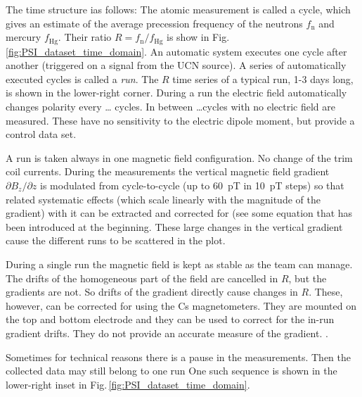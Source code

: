 The time structure ias follows: The atomic measurement is called a cycle, which gives an estimate of the average precession frequency of the neutrons $f_\mathrm{n}$ and mercury $f_\mathrm{Hg}$. Their ratio $R = f_\mathrm{n} / f_\mathrm{Hg}$ is show in Fig.\,\ref{fig:PSI_dataset_time_domain}. An automatic system executes one cycle after another (triggered on a signal from the UCN source). A series of automatically executed cycles is called a \emph{run}. The $R$ time series of a typical run, 1-3 days long, is shown in the lower-right corner. During a run the electric field automatically changes polarity every \ldots {} cycles. In between \ldots cycles with no electric field are measured. These have no sensitivity to the electric dipole moment, but provide a control data set.

A run is taken always in one magnetic field configuration. No change of the trim coil currents. During the measurements the vertical magnetic field gradient $\partial B_z / \partial z$ is modulated from cycle-to-cycle (up to \SI{60}{\pico\tesla} in \SI{10}{\pico\tesla} steps) so that related systematic effects (which scale linearly with the magnitude of the gradient) with it can be extracted and corrected for (see some equation that has been introduced at the beginning. These large changes in the vertical gradient cause the different runs to be scattered in the plot.

During a single run the magnetic field is kept as stable as the team can manage. The drifts of the homogeneous part of the field are cancelled in $R$, but the gradients are not. So drifts of the gradient directly cause changes in $R$. These, however, can be corrected for using the Cs magnetometers. They are mounted on the top and bottom electrode and they can be used to correct for the in-run gradient drifts. They do not provide an accurate measure of the gradient. .

Sometimes for technical reasons there is a pause in the measurements. Then the collected data may still belong to one run One such sequence is shown in the lower-right inset in Fig.\,\ref{fig:PSI_dataset_time_domain}.

